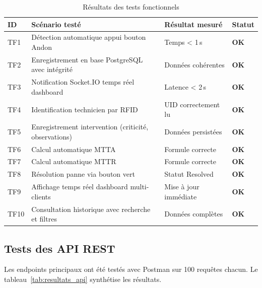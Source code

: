 \begin{table}[htbp]
\centering
\caption{Résultats des tests fonctionnels}
\label{tab:resultats_tests_fonctionnels}
\small
\begin{tabular}{@{}p{1cm}p{6cm}p{3cm}p{1.5cm}@{}}
\toprule
\textbf{ID} & \textbf{Scénario testé} & \textbf{Résultat mesuré} & \textbf{Statut} \\
\midrule
\rowcolor{gray!10}
TF1 & Détection automatique appui bouton Andon & Temps < 1\,s & \textcolor{green!60!black}{\textbf{OK}} \\
TF2 & Enregistrement en base PostgreSQL avec intégrité & Données cohérentes & \textcolor{green!60!black}{\textbf{OK}} \\
\rowcolor{gray!10}
TF3 & Notification Socket.IO temps réel dashboard & Latence < 2\,s & \textcolor{green!60!black}{\textbf{OK}} \\
TF4 & Identification technicien par RFID & UID correctement lu & \textcolor{green!60!black}{\textbf{OK}} \\
\rowcolor{gray!10}
TF5 & Enregistrement intervention (criticité, observations) & Données persistées & \textcolor{green!60!black}{\textbf{OK}} \\
TF6 & Calcul automatique MTTA & Formule correcte & \textcolor{green!60!black}{\textbf{OK}} \\
\rowcolor{gray!10}
TF7 & Calcul automatique MTTR & Formule correcte & \textcolor{green!60!black}{\textbf{OK}} \\
TF8 & Résolution panne via bouton vert & Statut Resolved & \textcolor{green!60!black}{\textbf{OK}} \\
\rowcolor{gray!10}
TF9 & Affichage temps réel dashboard multi-clients & Mise à jour immédiate & \textcolor{green!60!black}{\textbf{OK}} \\
TF10 & Consultation historique avec recherche et filtres & Données complètes & \textcolor{green!60!black}{\textbf{OK}} \\
\bottomrule
\end{tabular}
\end{table}

\subsection{Tests des API REST}

Les endpoints principaux ont été testés avec Postman sur 100 requêtes chacun. Le tableau~\ref{tab:resultats_api} synthétise les résultats.

